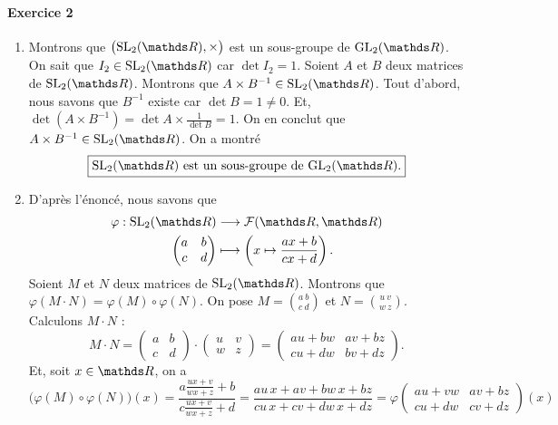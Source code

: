 \documentclass[a4paper]{article}
\begin{document}
	\paragraph{Exercice 2}
	\begin{enumerate}
		\item Montrons que $\big(\mathrm{SL}_2(\R), \times\big)$\/ est un sous-groupe de $\mathrm{GL}_2(\R)$.
			On sait que $I_2 \in \mathrm{SL}_2(\R)$\/ car $\det I_2 = 1$.
			Soient $A$\/ et $B$\/ deux matrices de $\mathrm{SL}_2(\R)$.
			Montrons que $A \times B^{-1} \in \mathrm{SL}_2(\R)$.
			Tout d'abord, nous savons que $B^{-1}$\/ existe car $\det B = 1 \neq 0$. Et, $\det(A \times B^{-1}) = \det A \times \frac{1}{\det B} = 1$. On en conclut que $A\times B^{-1} \in \mathrm{SL}_2(\R)$. On a montré \[
				\boxed{\text{$\mathrm{SL}_2(\R)$\/ est un sous-groupe de $\mathrm{GL}_2(\R)$}.}
			\]
		\item D'après l'énoncé, nous savons que \begin{align*}
			\varphi: \mathrm{SL}_2(\R) &\longrightarrow \mathscr{F}(\R,\R) \\
			\begin{pmatrix}
				a&b\\
				c&d
			\end{pmatrix} &\longmapsto \left(x \mapsto \frac{ax + b}{cx + d}\right).
		\end{align*}
		Soient $M$\/ et $N$\/ deux matrices de $\mathrm{SL}_2(\R)$. Montrons que $\varphi(M \cdot N) = \varphi(M) \circ\varphi(N)$.
		On pose $M = {a\: b\choose c\: d}$\/ et $N = {u\: v\choose w\: z}$.
		Calculons $M \cdot N$\/ :
		\[
			M \cdot N = \begin{pmatrix}
				a&b\\
				c&d
			\end{pmatrix} \cdot \begin{pmatrix}
				u&v\\
				w&z
			\end{pmatrix} = \begin{pmatrix}
				au + bw & av + bz\\
				cu + dw & bv + dz
			\end{pmatrix}
		.\] Et, soit $x \in \R$, on a
		\[
			\big(\varphi(M)  \circ \varphi(N)\big)(x) = \frac{a \frac{ux+v}{wx+z} + b}{c \frac{ux+v}{wx+z} + d} = \frac{au\,x + av + bw\,x + bz}{cu\,x + cv + dw\,x+dz} = \varphi \begin{pmatrix}
				au + vw & av + bz\\
				cu + dw & cv + dz
			\end{pmatrix} (x)
\]
\end{enumerate}
\end{document}
